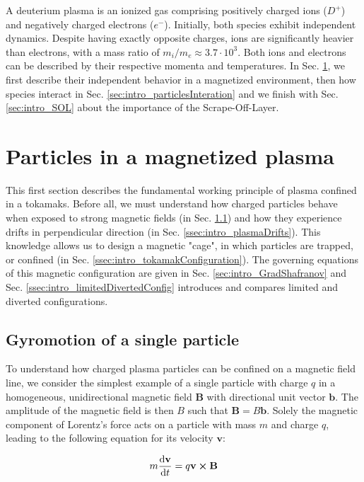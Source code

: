 A deuterium plasma is an ionized gas comprising positively charged ions ($D^+$) and negatively charged electrons ($e^-$). Initially, both species exhibit independent dynamics. Despite having exactly opposite charges, ions are significantly heavier than electrons, with a mass ratio of $m_i/m_e \approx 3.7\cdot 10^3$. Both ions and electrons can be described by their respective momenta and temperatures. In Sec. \ref{sec:intro_particlesInPlasma}, we first describe their independent behavior in a magnetized environment, then how species interact in Sec. \ref{sec:intro_particlesInteration} and we finish with Sec. \ref{sec:intro_SOL} about the importance of the Scrape-Off-Layer.


\section{Particles in a magnetized plasma}
\label{sec:intro_particlesInPlasma}

This first section describes the fundamental working principle of plasma confined in a tokamaks. Before all, we must understand how charged particles behave when exposed to strong magnetic fields (in Sec. \ref{ssec:intro_magneticConfinement}) and how they experience drifts in perpendicular direction (in Sec. \ref{ssec:intro_plasmaDrifts}). This knowledge allows us to design a magnetic "cage", in which particles are trapped, or confined (in Sec. \ref{ssec:intro_tokamakConfiguration}). The governing equations of this magnetic configuration are given in Sec. \ref{sec:intro_GradShafranov} and Sec. \ref{ssec:intro_limitedDivertedConfig} introduces and compares limited and diverted configurations.

\subsection{Gyromotion of a single particle}
\label{ssec:intro_magneticConfinement}
To understand how charged plasma particles can be confined on a magnetic field line, we consider the simplest example of a single particle with charge \( q \) in a homogeneous, unidirectional magnetic field \(\textbf{B}\) with directional unit vector \(\textbf{b}\). The amplitude of the magnetic field is then $B$ such that $\mathbf{B} = B\mathbf{b}$. Solely the magnetic component of Lorentz's force acts on a particle with mass \( m \) and charge \( q \), leading to the following equation for its velocity \(\textbf{v}\):

\begin{equation}
	\label{eq:gyromotion_LorentzForce}
	m\dv{\textbf{v}}{t} = q\textbf{v}\cross\textbf{B}
\end{equation}

